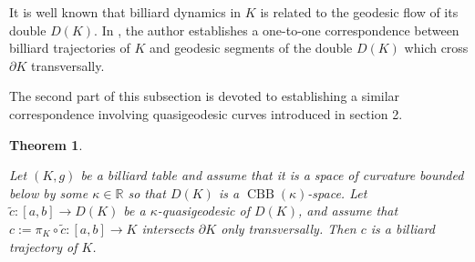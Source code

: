 \documentclass[11pt]{article}
\theoremstyle{definition}
\theoremstyle{remark}
\theoremstyle{plain}
\newtheorem{theorem}[definition]{Theorem}
\DeclareMathOperator{\CBB}{CBB}
\newcommand{\R}{\mathbb{R}}
\begin{document}
It is well known that billiard dynamics in $K$ is related to the geodesic flow of its double $D(K)$. In \cite{tabac}, the author establishes a one-to-one correspondence between billiard trajectories of $K$ and geodesic segments of the double $D(K)$ which cross $\partial K$ transversally.

The second part of this subsection is devoted to establishing a similar correspondence involving quasigeodesic curves introduced in section 2.

\begin{theorem}\label{thm:quasigeodesic_characterization}

Let $(K,g)$ be a billiard table and assume that it is a space of curvature bounded below by some $\kappa\in \R$ so that $D(K)$ is a $\CBB(\kappa)$-space. Let $\tilde c:[a,b]\to D(K)$ be a $\kappa$-quasigeodesic of $D(K)$, and assume that $c:=\pi_K\circ \tilde c:[a,b]\to K$ intersects $\partial K$ only transversally. Then $c$ is a billiard trajectory of $K$.

\end{theorem}
\end{document}
